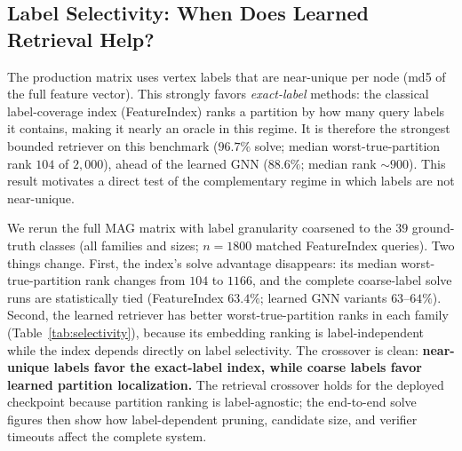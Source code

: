 \documentclass[runningheads]{llncs}
\begin{document}
\subsection{Label Selectivity: When Does Learned Retrieval Help?}
\label{sec:selectivity}

The production matrix uses vertex labels that are near-unique per node (md5 of the full feature vector). This strongly favors \emph{exact-label} methods: the classical label-coverage index (FeatureIndex) ranks a partition by how many query labels it contains, making it nearly an oracle in this regime. It is therefore the strongest bounded retriever on this benchmark ($96.7\%$ solve; median worst-true-partition rank $104$ of $2{,}000$), ahead of the learned GNN ($88.6\%$; median rank ${\sim}900$). This result motivates a direct test of the complementary regime in which labels are not near-unique.

We rerun the full MAG matrix with label granularity coarsened to the $39$ ground-truth classes (all families and sizes; $n{=}1800$ matched FeatureIndex queries). Two things change. First, the index's solve advantage disappears: its median worst-true-partition rank changes from $104$ to $1166$, and the complete coarse-label solve runs are statistically tied (FeatureIndex $63.4\%$; learned GNN variants $63$--$64\%$). Second, the learned retriever has better worst-true-partition ranks in each family (Table~\ref{tab:selectivity}), because its embedding ranking is label-independent while the index depends directly on label selectivity. The crossover is clean: \textbf{near-unique labels favor the exact-label index, while coarse labels favor learned partition localization.} The retrieval crossover holds for the deployed checkpoint because partition ranking is label-agnostic; the end-to-end solve figures then show how label-dependent pruning, candidate size, and verifier timeouts affect the complete system.
\end{document}
